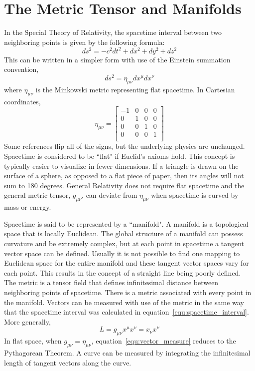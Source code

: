 \section{The Metric Tensor and Manifolds}

In the Special Theory of Relativity, the spacetime interval between two neighboring points is given by the following formula:
\begin{equation}
\label{equ:spacetime_interval}
    ds^{2} = -c^{2}dt^{2} + dx^{2} + dy^{2} + dz^{2}
\end{equation}
This can be written in a simpler form with use of the Einstein summation convention,
\begin{equation}
    ds^{2} = \eta_{\mu\nu}dx^{\mu}dx^{\nu}
\end{equation}
where $\eta_{\mu\nu}$ is the Minkowski metric representing flat spacetime. In Cartesian coordinates,
\begin{equation}
    \eta_{\mu\nu} = 
    \begin{bmatrix} 
    -1 & 0 & 0 & 0 \\
    0 & 1 & 0 & 0 \\
    0 & 0 & 1 & 0 \\
    0 & 0 & 0 & 1 \\
    \end{bmatrix}
\end{equation}
Some references flip all of the signs, but the underlying physics are unchanged. Spacetime is considered to be ``flat" if Euclid's axioms hold. This concept is typically easier to visualize in fewer dimensions. If a triangle is drawn on the surface of a sphere, as opposed to a flat piece of paper, then its angles will not sum to 180 degrees. General Relativity does not require flat spacetime and the general metric tensor, $g_{\mu\nu}$, can deviate from $\eta_{\mu\nu}$ when spacetime is curved by mass or energy.

Spacetime is said to be represented by a ``manifold". A manifold is a topological space that is locally Euclidean. The global structure of a manifold can possess curvature and be extremely complex, but at each point in spacetime a tangent vector space can be defined. Usually it is not possible to find one mapping to Euclidean space for the entire manifold and these tangent vector spaces vary for each point. This results in the concept of a straight line being poorly defined. The metric is a tensor field that defines infinitesimal distance between neighboring points of spacetime. There is a metric associated with every point in the manifold. Vectors can be measured with use of the metric in the same way that the spacetime interval was calculated in equation~\ref{equ:spacetime_interval}. More generally,
\begin{equation}
\label{equ:vector_measure}
    L = g_{\mu\nu}x^{\mu}x^{\nu} = x_{\nu}x^{\nu}
\end{equation}
In flat space, when $g_{\mu\nu} = \eta_{\mu\nu}$, equation~\ref{equ:vector_measure} reduces to the Pythagorean Theorem. A curve can be measured by integrating the infinitesimal length of tangent vectors along the curve.

